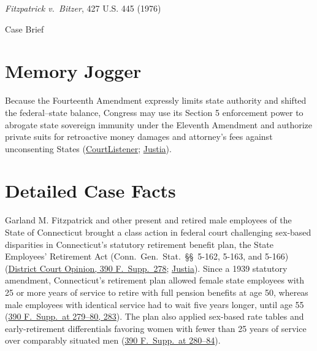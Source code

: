 \documentclass[12pt]{article}
\begin{document}
\begin{center}
{\LARGE \textit{Fitzpatrick v.\ Bitzer}, 427 U.S. 445 (1976)\par}
\vspace{0.8em}
{\large Case Brief\par}
\end{center}
\vspace{1em}

\section{Memory Jogger}

Because the Fourteenth Amendment expressly limits state authority and shifted the federal--state balance, Congress may use its Section 5 enforcement power to abrogate state sovereign immunity under the Eleventh Amendment and authorize private suits for retroactive money damages and attorney's fees against unconsenting States (\href{https://www.courtlistener.com/opinion/109520/fitzpatrick-v-bitzer/}{CourtListener}; \href{https://supreme.justia.com/cases/federal/us/427/445/}{Justia}).

\section{Detailed Case Facts}

Garland M. Fitzpatrick and other present and retired male employees of the State of Connecticut brought a class action in federal court challenging sex-based disparities in Connecticut's statutory retirement benefit plan, the State Employees' Retirement Act (Conn.\ Gen.\ Stat.\ \S\S~5-162, 5-163, and 5-166) (\href{https://law.justia.com/cases/federal/district-courts/FSupp/390/278/1966559/}{District Court Opinion, 390 F.\ Supp.\ 278}; \href{https://supreme.justia.com/cases/federal/us/427/445/}{Justia}). Since a 1939 statutory amendment, Connecticut's retirement plan allowed female state employees with 25 or more years of service to retire with full pension benefits at age 50, whereas male employees with identical service had to wait five years longer, until age 55 (\href{https://law.justia.com/cases/federal/district-courts/FSupp/390/278/1966559/}{390 F.\ Supp.\ at 279--80, 283}). The plan also applied sex-based rate tables and early-retirement differentials favoring women with fewer than 25 years of service over comparably situated men (\href{https://law.justia.com/cases/federal/district-courts/FSupp/390/278/1966559/}{390 F.\ Supp.\ at 280--84}).
\end{document}
